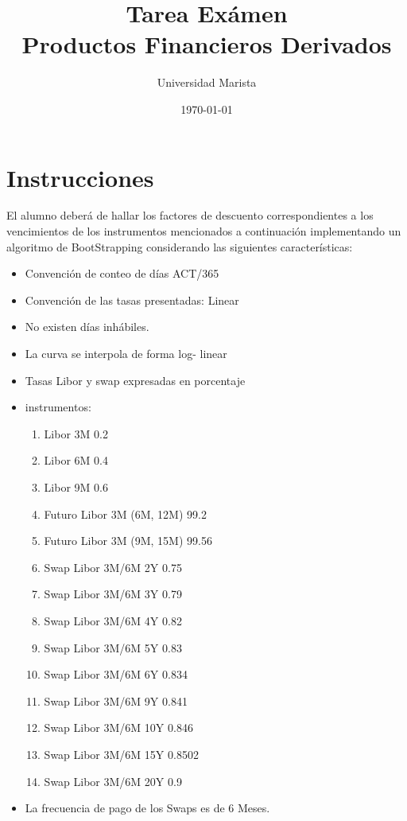 \documentclass{article}
\title{Tarea Exámen \\ Productos Financieros Derivados}
\author{Universidad Marista}
\date{\today}
\begin{document}
\maketitle


\section{Instrucciones}
El alumno deberá de hallar los factores de descuento 
correspondientes a los vencimientos de los instrumentos 
mencionados a continuación implementando un algoritmo de BootStrapping considerando las
siguientes características:
\begin{itemize}
\item Convención de conteo de días ACT/365
\item Convención de las tasas presentadas: Linear
\item No existen días inhábiles.
\item La curva se interpola de forma log- linear
\item Tasas Libor y swap expresadas en porcentaje
\item instrumentos:
    \begin{enumerate}
        \item Libor 3M 0.2
        \item Libor 6M 0.4
        \item Libor 9M 0.6
        \item Futuro Libor 3M (6M, 12M) 99.2
        \item Futuro Libor 3M (9M, 15M) 99.56
        \item Swap Libor 3M/6M 2Y 0.75
        \item Swap Libor 3M/6M 3Y 0.79
        \item Swap Libor 3M/6M 4Y 0.82
        \item Swap Libor 3M/6M 5Y 0.83
        \item Swap Libor 3M/6M 6Y 0.834
        \item Swap Libor 3M/6M 9Y 0.841
        \item Swap Libor 3M/6M 10Y 0.846
        \item Swap Libor 3M/6M 15Y 0.8502
        \item Swap Libor 3M/6M 20Y 0.9
    \end{enumerate}

\item La frecuencia de pago de los Swaps es de 6 Meses.


\end{itemize}
\end{document}
